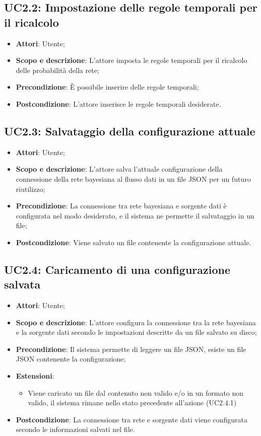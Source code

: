 \subsection{UC2.2: Impostazione delle regole temporali per il ricalcolo}
\hypertarget{UC2.2}{}
\begin{itemize}
	\item \textbf{Attori}: Utente;
	\item \textbf{Scopo e descrizione}: L'attore imposta le regole temporali per il ricalcolo delle probabilità della rete;
	\item \textbf{Precondizione}: È possibile inserire delle regole temporali;
	\item \textbf{Postcondizione}: L'attore inserisce le regole temporali desiderate.
\end{itemize}
\subsection{UC2.3: Salvataggio della configurazione attuale}

\hypertarget{UC2.3}{}
\begin{itemize}
	\item \textbf{Attori}: Utente;
	\item \textbf{Scopo e descrizione}: L'attore salva l'attuale configurazione della connessione della rete bayesiana al flusso dati in un file JSON per un futuro riutilizzo;
	\item \textbf{Precondizione}: La connessione tra rete bayesiana e sorgente dati è configurata nel modo desiderato, e il sistema ne permette il salvataggio in un file;
	\item \textbf{Postcondizione}: Viene salvato un file contenente la configurazione attuale.
\end{itemize}

\subsection{UC2.4: Caricamento di una configurazione salvata}
\hypertarget{UC2.4}{}
\begin{itemize}
	\item \textbf{Attori}: Utente;
	\item \textbf{Scopo e descrizione}: L'attore configura la connessione tra la rete bayesiana e la sorgente dati secondo le impostazioni descritte da un file salvato su disco;
	\item \textbf{Precondizione}: Il sistema permette di leggere un file JSON, esiste un file JSON contenente la configurazione;
	\item \textbf{Estensioni}: 
	\begin{itemize}
		\item  Viene caricato un file dal contenuto non valido e/o in un formato non valido, il sistema rimane nello stato precedente all'azione (UC2.4.1)
	\end{itemize}
	\item \textbf{Postcondizione}: La connessione tra rete e sorgente dati viene configurata secondo le informazioni salvati nel file.
\end{itemize}

